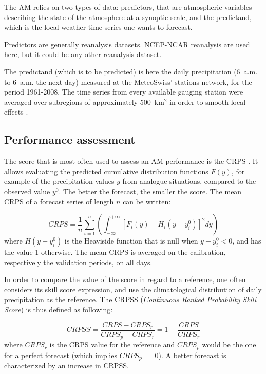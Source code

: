 \documentclass[review]{elsarticle}
\begin{document}
The AM relies on two types of data: predictors, that are atmospheric variables describing the state of the atmosphere at a synoptic scale, and the predictand, which is the local weather time series one wants to forecast.

Predictors are generally reanalysis datasets. NCEP-NCAR reanalysis \citep[6-hourly, 17 pressure levels at a resolution of 2.5\degree, see][]{Kalnay1996} are used here, but it could be any other reanalysis dataset.

The predictand (which is to be predicted) is here the daily precipitation (6~a.m. to 6~a.m. the next day) measured at the MeteoSwiss' stations network, for the period 1961-2008. The time series from every available gauging station were averaged over subregions of approximately 500~km$^{2}$ in order to smooth local effects \citep{Obled2002, Marty2012}.


\subsection{Performance assessment}
\label{sec:score}

The score that is most often used to assess an AM performance is the CRPS \citep[Continuous Ranked Probability Score,][]{Brown1974, Matheson1976, Hersbach2000}. It allows evaluating the predicted cumulative distribution functions $F(y)$, for example of the precipitation values $y$ from analogue situations, compared to the observed value $y^{0}$. The better the forecast, the smaller the score. The mean CRPS of a forecast series of length $n$ can be written:

\begin{equation}
\label{eq:CRPS}
CRPS = \frac{1}{n} \sum_{i=1}^{n} \left(  \int_{-\infty}^{+\infty} \left[ F_{i}(y)-H_{i}(y-y_{i}^{0})\right]^{2} dy \right) 
\end{equation}
where $H(y-y_{i}^{0})$ is the Heaviside function that is null when $y-y_{i}^{0}<0$, and has the value 1 otherwise. The mean CRPS is averaged on the calibration, respectively the validation periods, on all days.

In order to compare the value of the score in regard to a reference, one often considers its skill score expression, and use the climatological distribution of daily precipitation as the reference. The CRPSS (\textit{Continuous Ranked Probability Skill Score}) is thus defined as following:

\begin{equation}
\label{eq:CRPSS}
CRPSS = \frac{CRPS-CRPS_{r}}{CRPS_{p}-CRPS_{r}} = 1-\frac{CRPS}{CRPS_{r}}
\end{equation}
where $CRPS_{r}$ is the CRPS value for the reference and $CRPS_{p}$ would be the one for a perfect forecast (which implies $CRPS_{p}~=~0$). A better forecast is characterized by an increase in CRPSS.
\end{document}
